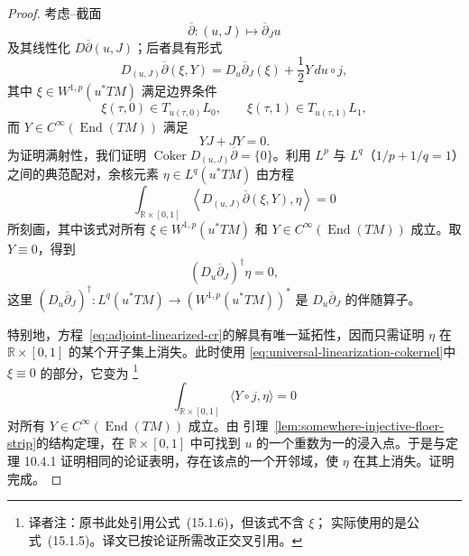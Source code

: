 \begin{proof}
考虑\personCauchy{}--\personRiemann{}截面
\[
 \overline\partial:(u,J)\longmapsto\overline\partial_Ju
\]
及其线性化 $D\overline\partial(u,J)$；后者具有形式
\[
 D_{(u,J)}\overline\partial(\xi,Y)
 =D_u\overline\partial_J(\xi)+\frac12Y\,du\circ j,
\]
其中 $\xi\in W^{1,p}(u^*TM)$ 满足边界条件
\[
 \xi(\tau,0)\in T_{u(\tau,0)}L_0,
 \qquad
 \xi(\tau,1)\in T_{u(\tau,1)}L_1,
\]
而 $Y\in C^\infty(\operatorname{End}(TM))$ 满足
\[
 YJ+JY=0.
\]
为证明满射性，我们证明
$\operatorname{Coker}D_{(u,J)}\overline\partial=\{0\}$。利用 $L^p$ 与
$L^q$（$1/p+1/q=1$）之间的典范配对，余核元素
$\eta\in L^q(u^*TM)$ 由方程
\begin{equation}
 \int_{\mathbb R\times[0,1]}
 \left\langle D_{(u,J)}\overline\partial(\xi,Y),\eta\right\rangle=0
 \label{eq:universal-linearization-cokernel}
\end{equation}
所刻画，其中该式对所有 $\xi\in W^{1,p}(u^*TM)$ 和
$Y\in C^\infty(\operatorname{End}(TM))$ 成立。取 $Y\equiv0$，得到
\begin{equation}
 (D_u\overline\partial_J)^\dagger\eta=0,
 \label{eq:adjoint-linearized-cr}
\end{equation}
这里
$(D_u\overline\partial_J)^\dagger:L^q(u^*TM)\to(W^{1,p}(u^*TM))^*$
是 $D_u\overline\partial_J$ 的伴随算子。

特别地，方程~\eqref{eq:adjoint-linearized-cr}的解具有唯一延拓性，因而只需证明
$\eta$ 在 $\mathbb R\times[0,1]$ 的某个开子集上消失。此时使用
\eqref{eq:universal-linearization-cokernel}中 $\xi\equiv0$ 的部分，它变为
\footnote{译者注：原书此处引用公式~(15.1.6)，但该式不含 $\xi$；
实际使用的是公式~(15.1.5)。译文已按论证所需改正交叉引用。}
\[
 \int_{\mathbb R\times[0,1]}\langle Y\circ j,\eta\rangle=0
\]
对所有 $Y\in C^\infty(\operatorname{End}(TM))$ 成立。由
引理~\ref{lem:somewhere-injective-floer-strip}的结构定理，在
$\mathbb R\times[0,1]$ 中可找到 $u$ 的一个重数为一的浸入点。于是与定理 10.4.1
证明相同的论证表明，存在该点的一个开邻域，使 $\eta$ 在其上消失。证明完成。
\end{proof}
